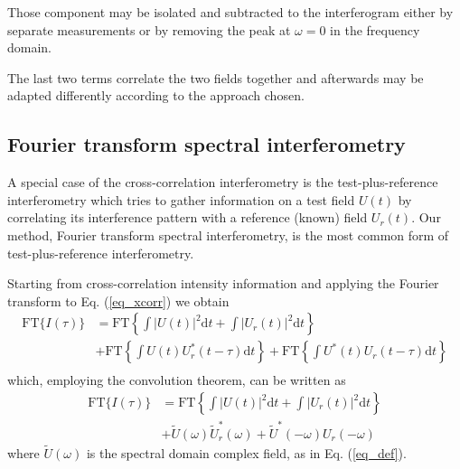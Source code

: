 \documentclass[12pt,a4paper,twoside]{article}
\begin{document}
Those component may be isolated and subtracted to the interferogram either by separate measurements or by removing the peak at $\omega = 0$ in the frequency domain.

The last two terms correlate the two fields together and afterwards may be adapted differently according to the approach chosen.

\subsection{Fourier transform spectral interferometry}
A special case of the cross-correlation interferometry is the test-plus-reference interferometry which tries to gather information on a test field $U(t)$ by correlating its interference pattern with a reference (known) field $U_r(t)$.
Our method, Fourier transform spectral interferometry, is the most common form of test-plus-reference interferometry.

Starting from cross-correlation intensity information and applying the Fourier transform to Eq. (\ref{eq_xcorr}) we obtain
\begin{align}
	\mathrm{FT} \lbrace I(\tau) \rbrace
	&= \mathrm{FT} 	\left\lbrace	
						\int|U(t)|^2\mathrm{d}t + \int|U_r(t)|^2\mathrm{d}t
					\right\rbrace \nonumber\\
	&+
		\mathrm{FT}	\left\lbrace	
						\int U(t)U_r^*(t-\tau)\mathrm{d}t
					\right\rbrace
	+	\mathrm{FT}	\left\lbrace	
						\int U^*(t)U_r(t-\tau)\mathrm{d}t
					\right\rbrace \\
	\label{eq_FTspectrum}
\end{align}
which, employing the convolution theorem, can be written as
\begin{align}
	\mathrm{FT} \lbrace I(\tau) \rbrace
	&= \mathrm{FT}	\left\lbrace \int|U(t)|^2\mathrm{d}t + \int|U_r(t)|^2\mathrm{d}t \right\rbrace \nonumber \\
	&+ \tilde{U}(\omega)\tilde{U}_r^*(\omega)
	+ \tilde{U}^*(-\omega)U_r(-\omega)
	\label{eq_FTspectrum1}
\end{align}
where $\tilde{U}(\omega)$ is the spectral domain complex field, as in Eq. (\ref{eq_def}).
\end{document}
